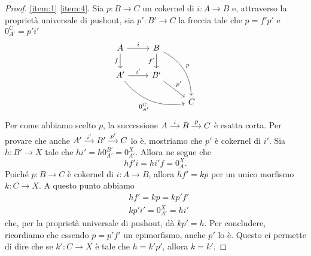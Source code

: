 \begin{proof}
  \ref{item:1} \Rightarrow \ref{item:4}. Sia \(p : B \to C\) un cokernel
  di \(i : A \to B\) e, attraverso la proprietà universale di pushout,
  sia \(p' : B' \to C\) la freccia tale che \(p = f' p'\) e
  \(0_{A'}^C = p' i'\)
  \[
    \begin{tikzcd}
      A \ar["{f}", d, swap] \ar["{i}", r] & B \ar["{f'}", d, swap]
      \ar["{p}", ddr, bend left] \\
      A' \ar["{i'}", r] \ar["{0_{A'}^C}", drr, bend right, swap] &
      B' \ar["{p'}", dr] \\
      & & C
    \end{tikzcd}
  \]
  Per come abbiamo scelto \(p\), la successione
  \(\begin{tikzcd}[column sep=small, cramped] A \ar["{i}", r] & B
    \ar["{p}", r] & C \end{tikzcd}\) è esatta corta. Per provare che
  anche
  \(\begin{tikzcd}[column sep=small, cramped] A' \ar["{i'}", r] & B'
    \ar["{p'}", r] & C \end{tikzcd}\) lo è, mostriamo che \(p'\) è
  cokernel di \(i'\). Sia \(h : B' \to X\) tale che
  \(h i' = h 0_{A'}^{B'} = 0_{A'}^X\). Allora ne segue che
  \[
    h f' i = h i' f = 0_A^X .
  \]
  Poiché \(p : B \to C\) è cokernel di \(i : A \to B\), allora
  \(h f' = k p\) per un unico morfismo \(k : C \to X\). A questo punto
  abbiamo
  \begin{align*}
    & h f' = k p = k p' f' \\
    & k p' i' = 0_{A'}^X = h i'
  \end{align*}
  che, per la proprietà universale di pushout, dà \(k p' = h\). Per
  concludere, ricordiamo che essendo \(p = p' f'\) un epimorfismo, anche
  \(p'\) lo è. Questo ci permette di dire che se \(k' : C \to X\) è tale
  che \(h = k' p'\), allora \(k = k'\).


\end{proof}
